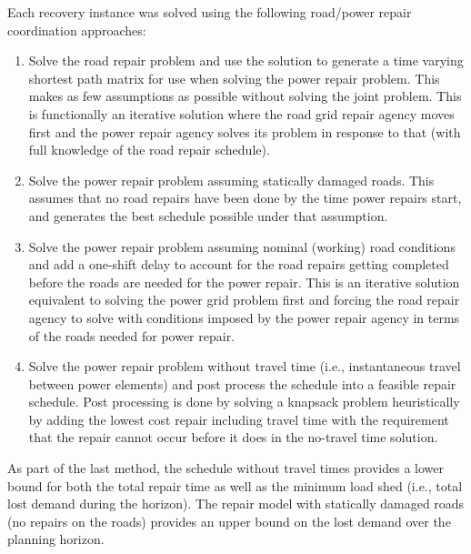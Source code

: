 \documentclass[10pt]{article}
\begin{document}
 Each recovery instance was solved using the following road/power repair coordination approaches:
 \vspace{-8pt}
 \begin{enumerate}
 	\item Solve the road repair problem and use the solution to generate a time varying shortest path matrix for use when solving the power repair problem. This makes as few assumptions as possible without solving the joint problem. This is functionally an iterative solution where the road grid repair agency moves first and the power repair agency solves its problem in response to that (with full knowledge of the road repair schedule).
 	\item Solve the power repair problem assuming statically damaged roads. This assumes that no road repairs have been done by the time power repairs  start, and generates the best schedule possible under that assumption.
 	\item Solve the power repair problem assuming nominal (working) road conditions and add a one-shift delay to account for the road repairs getting completed  before the roads are needed for the power repair. This is an iterative solution equivalent to solving the power grid problem first and forcing the road repair agency to solve with conditions imposed by the power repair agency in terms of the roads needed for power repair.
 	\item Solve the power repair problem without travel time (i.e., instantaneous travel between power elements) and post process the schedule into a feasible repair schedule. Post processing is done by solving a knapsack problem heuristically by adding the lowest cost repair including travel time with the requirement that the repair cannot occur before it does in the no-travel time solution.
 \end{enumerate}
\vspace{-8pt}
As part of the last method, the schedule without travel times provides a lower bound for both the total repair time as well as the minimum load shed (i.e., total lost demand during the horizon). The repair model with statically damaged roads (no repairs on the roads) provides an upper bound on the lost demand over the planning horizon.
\end{document}
